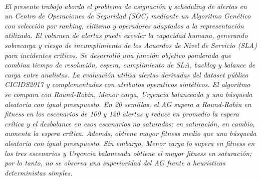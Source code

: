 \documentclass[12pt,a4paper,twocolumn]{article}
\begin{document}
\vspace{0.8em}

 \\
{\fontsize{10}{12}\selectfont\itshape 
El presente trabajo aborda el problema de asignación y scheduling de alertas en un Centro de Operaciones de Seguridad (SOC) mediante un Algoritmo Genético con selección por ranking, elitismo y operadores adaptados a la representación utilizada. El volumen de alertas puede exceder la capacidad humana, generando sobrecarga y riesgo de incumplimiento de los Acuerdos de Nivel de Servicio (SLA) para incidentes críticos. Se desarrolló una función objetivo ponderada que combina tiempo de resolución, espera, cumplimiento de SLA, backlog y balance de carga entre analistas. La evaluación utiliza alertas derivadas del dataset público CICIDS2017 y complementadas con atributos operativos sintéticos. El algoritmo se compara con Round-Robin, Menor carga, Urgencia balanceada y una búsqueda aleatoria con igual presupuesto. En 20 semillas, el AG supera a Round-Robin en fitness en los escenarios de 100 y 120 alertas y reduce en promedio la espera crítica y el desbalance en esos escenarios no saturados; en saturación, en cambio, aumenta la espera crítica. Además, obtiene mayor fitness medio que una búsqueda aleatoria con igual presupuesto. Sin embargo, Menor carga lo supera en fitness en los tres escenarios y Urgencia balanceada obtiene el mayor fitness en saturación; por lo tanto, no se observa una superioridad del AG frente a heurísticas deterministas simples.\par}
\vspace{0.8em}
\end{document}
